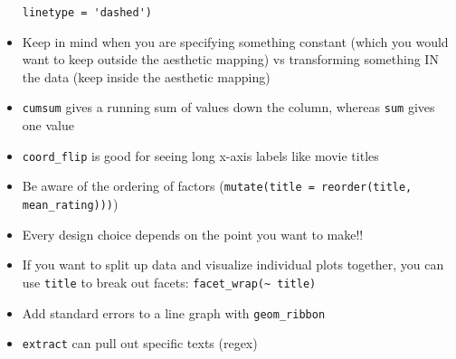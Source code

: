 \begin{itemize}
	\verb|linetype = 'dashed')|
	\item Keep in mind when you are specifying something constant (which you would want to keep outside the aesthetic mapping) vs transforming something IN the data (keep inside the aesthetic mapping)
	\item \verb|cumsum| gives a running sum of values down the column, whereas \verb|sum| gives one value
	\item \verb|coord_flip| is good for seeing long x-axis labels like movie titles
	\item Be aware of the ordering of factors (\verb|mutate(title = reorder(title, mean_rating)))|)
	\item Every design choice depends on the point you want to make!!
	\item If you want to split up data and visualize individual plots together, you can use \verb|title| to break out facets: \verb|facet_wrap(~ title)|
	\item Add standard errors to a line graph with \verb|geom_ribbon|
	\item \verb|extract| can pull out specific texts (regex)
\end{itemize}



%
%
%
%
%

